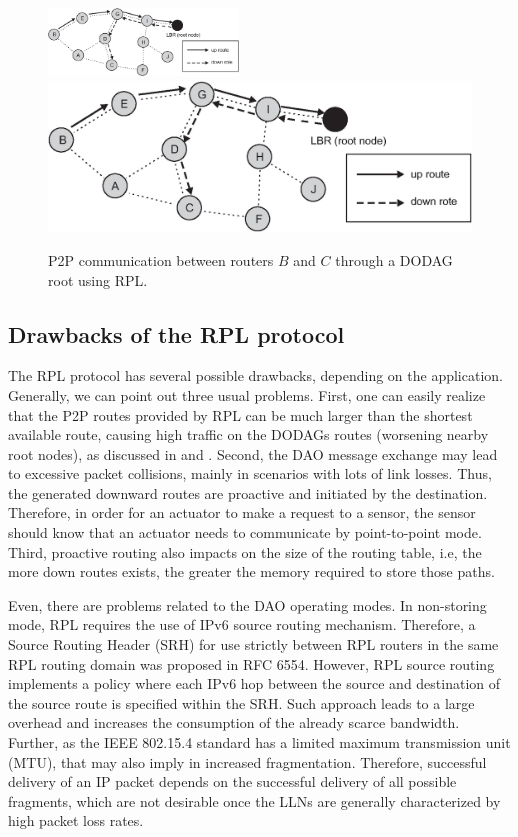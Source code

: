 \documentclass[final,authoryear,3p,twocolumn]{elsarticle}
\begin{document}
\begin{figure}[h!tb]
\centering
\ifdefined\TWOCOL
\includegraphics[width=0.45\textwidth]{figures/RPL_DAO}
\else
\includegraphics[width=1\textwidth]{figures/RPL_DAO}
\fi
\caption{P2P communication between routers $B$ and $C$ through a DODAG root using RPL.}
\label{RPL_DAO}
\end{figure}

\subsection{Drawbacks of the RPL protocol}

The RPL protocol has several possible drawbacks, depending on the application. Generally, we can point out three usual problems. First, one can easily realize that the P2P routes provided by RPL can be much larger than the shortest available route, causing high traffic on the DODAGs routes (worsening nearby root nodes), as discussed in \citep{P2P_analysis_2010} and \citep{P2P-RPL_2011}. Second, the DAO message exchange may lead to excessive packet collisions, mainly in scenarios with lots of link losses. Thus, the generated downward routes are proactive and initiated by the destination. Therefore, in order for an actuator to make a request to a sensor, the sensor should know that an actuator needs to communicate by point-to-point mode. Third, proactive routing also impacts on the size of the routing table, i.e, the more down routes exists, the greater the memory required to store those paths.

Even, there are problems related to the DAO operating modes. In non-storing mode, RPL requires the use of IPv6 source routing mechanism. Therefore, a Source Routing Header (SRH) for use strictly between RPL routers in the same RPL routing domain was proposed in RFC 6554. However, RPL source routing implements a policy where each IPv6 hop between the source and destination of the source route is specified within the SRH. Such approach leads to a large overhead and increases the consumption of the already scarce bandwidth. Further, as the IEEE 802.15.4 standard has a limited maximum transmission unit (MTU), that may also imply in increased fragmentation. Therefore, successful delivery of an IP packet depends on the successful delivery of all possible fragments, which are not desirable once the LLNs are generally characterized by high packet loss rates.
\end{document}
